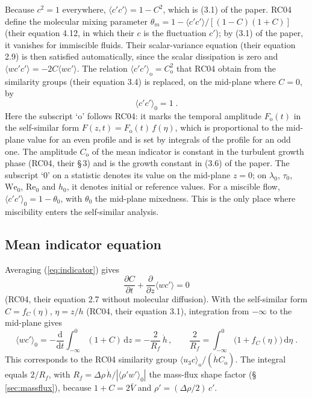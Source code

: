 \documentclass[11pt]{article}
\newcommand{\avg}[1]{\langle #1\rangle}
\newcommand{\We}{\mathrm{We}_0}
\newcommand{\hd}{\dot h}
\newcommand{\pd}[2]{\frac{\partial #1}{\partial #2}}
\begin{document}
Because $c^2 = 1$ everywhere, $\avg{c' c'} = 1 - C^2$, which is (3.1) of the paper. RC04 define the molecular mixing parameter $\theta_m = 1 - \avg{c' c'}/[(1 - C)(1 + C)]$ (their equation 4.12, in which their $c$ is the fluctuation $c'$); by (3.1) of the paper, it vanishes for immiscible fluids. Their scalar-variance equation (their equation 2.9) is then satisfied automatically, since the scalar dissipation is zero and $\avg{w c' c'} = -2 C \avg{w c'}$. The relation $\avg{c' c'}_\mathrm{o} = C_\mathrm{o}^2$ that RC04 obtain from the similarity groups (their equation 3.4) is replaced, on the mid-plane where $C = 0$, by
\begin{equation}
  \avg{c' c'}_0 = 1 \;.
  \label{eq:cc0}
\end{equation}
Here the subscript `$\mathrm{o}$' follows RC04: it marks the temporal amplitude $F_\mathrm{o}(t)$ in the self-similar form $F(z, t) = F_\mathrm{o}(t) \, f(\eta)$, which is proportional to the mid-plane value for an even profile and is set by integrals of the profile for an odd one. The amplitude $C_\mathrm{o}$ of the mean indicator is constant in the turbulent growth phase (RC04, their \S\,3) and is the growth constant in (3.6) of the paper. The subscript `$0$' on a statistic denotes its value on the mid-plane $z = 0$; on $\lambda_0$, $\tau_0$, $\We$, $\mathrm{Re}_0$ and $h_0$, it denotes initial or reference values. For a miscible flow, $\avg{c' c'}_0 = 1 - \theta_0$, with $\theta_0$ the mid-plane mixedness. This is the only place where miscibility enters the self-similar analysis.

\subsection{Mean indicator equation}\label{sec:mean}

Averaging (\ref{eq:indicator}) gives
\begin{equation}
  \pd{C}{t} + \pd{}{z} \avg{w c'} = 0
  \label{eq:mean}
\end{equation}
(RC04, their equation 2.7 without molecular diffusion). With the self-similar form $C = f_C(\eta)$, $\eta = z/h$ (RC04, their equation 3.1), integration from $-\infty$ to the mid-plane gives
\begin{equation}
  \avg{w c'}_0 = -\frac{\mathrm d}{\mathrm d t} \int_{-\infty}^0 (1 + C) \, \mathrm d z = -\frac{2}{R_f} \, \hd \, , \qquad \frac{2}{R_f} = \int_{-\infty}^0 \big(1 + f_C(\eta)\big) \, \mathrm d \eta \;.
  \label{eq:flux_mean}
\end{equation}
This corresponds to the RC04 similarity group $\avg{u_3 c}_\mathrm{o}/(\hd C_\mathrm{o})$. The integral equals $2/R_f$, with $R_f = \Delta \rho \, \hd/| \avg{\rho' w'}_0 |$ the mass-flux shape factor (\S\,\ref{sec:massflux}), because $1 + C = 2 \bar V$ and $\rho' = (\Delta \rho/2) \, c'$.
\end{document}
